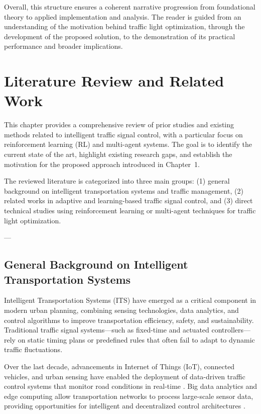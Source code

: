 \documentclass[12pt]{report} %
\begin{document}
Overall, this structure ensures a coherent narrative progression from foundational theory to applied implementation and analysis. The reader is guided from an understanding of the motivation behind traffic light optimization, through the development of the proposed solution, to the demonstration of its practical performance and broader implications.

\chapter{Literature Review and Related Work}

This chapter provides a comprehensive review of prior studies and existing methods related to intelligent traffic signal control, with a particular focus on reinforcement learning (RL) and multi-agent systems. The goal is to identify the current state of the art, highlight existing research gaps, and establish the motivation for the proposed approach introduced in Chapter~1. 

The reviewed literature is categorized into three main groups: (1) general background on intelligent transportation systems and traffic management, (2) related works in adaptive and learning-based traffic signal control, and (3) direct technical studies using reinforcement learning or multi-agent techniques for traffic light optimization.

---

\section{General Background on Intelligent Transportation Systems}

Intelligent Transportation Systems (ITS) have emerged as a critical component in modern urban planning, combining sensing technologies, data analytics, and control algorithms to improve transportation efficiency, safety, and sustainability. Traditional traffic signal systems—such as fixed-time and actuated controllers—rely on static timing plans or predefined rules that often fail to adapt to dynamic traffic fluctuations. 

Over the last decade, advancements in Internet of Things (IoT), connected vehicles, and urban sensing have enabled the deployment of data-driven traffic control systems that monitor road conditions in real-time \cite{ITS2022_Overview,UrbanMobility2021,SmartCity2023}. Big data analytics and edge computing allow transportation networks to process large-scale sensor data, providing opportunities for intelligent and decentralized control architectures \cite{EdgeIntelligence_2023,SmartEdge_2023}.  
\end{document}
